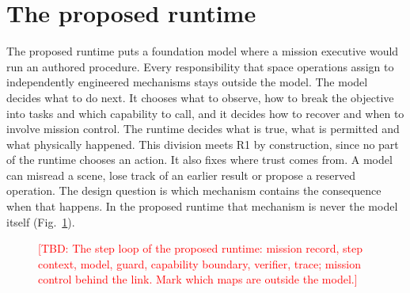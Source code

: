 \providecommand{\TBD}[1]{\textcolor{red}{[TBD: #1]}}

\section{The proposed runtime}
\label{sec:method}

The proposed runtime puts a foundation model where a mission executive would run an authored procedure. Every
responsibility that space operations assign to independently engineered mechanisms stays outside the model. The model
decides what to do next. It chooses what to observe, how to break the objective into tasks and which capability to
call, and it decides how to recover and when to involve mission control. The runtime decides what is true, what is
permitted and what physically happened. This division meets R1 by construction, since no part of the runtime chooses an action. It also fixes where
trust comes from. A model can misread a scene, lose track of an earlier result or propose a reserved operation. The
design question is which mechanism contains the consequence when that happens. In the proposed runtime that mechanism is
never the model itself (Fig.~\ref{fig:architecture}).

\begin{figure}[t]
  \centering
  \caption{\TBD{The step loop of the proposed runtime: mission record, step context, model, guard, capability boundary,
  verifier, trace; mission control behind the link. Mark which maps are outside the model.}}
  \label{fig:architecture}
\end{figure}


